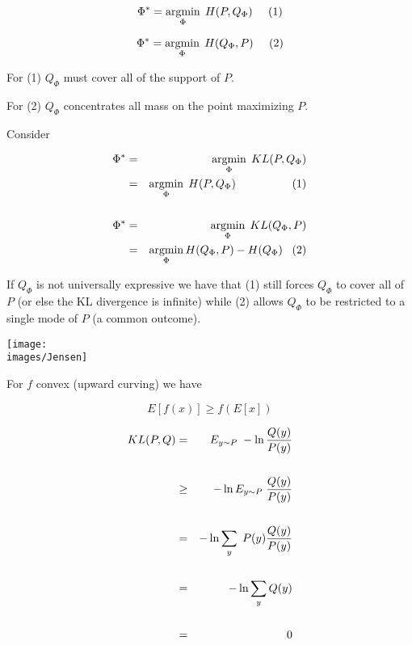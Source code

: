 {$$\Phi^* = \operatorname*{argmin}_\Phi \;H(P,Q_\Phi)\;\;\;\;\;(1)$$

\vfill
$$\Phi^* = \operatorname*{argmin}_\Phi \;H(Q_\Phi,P)\;\;\;\;\;(2)$$

\vfill
For (1) $Q_\Phi$ must cover all of the support of $P$.

\vfill
For (2) $Q_\Phi$ concentrates all mass on the point maximizing $P$.

    
Consider 


\begin{eqnarray*}
  \Phi^* & = & \operatorname*{argmin}_\Phi \;KL(P,Q_\Phi) \\
  & = & \operatorname*{argmin}_\Phi\; H(P,Q_\Phi)\;\;\;\;\;\;\;\;\;\;\;\;\;\;\;\;\;\;(1) \\
  \\
  \Phi^* & = & \operatorname*{argmin}_\Phi \;KL(Q_\Phi,P) \\
  & = & \operatorname*{argmin}_\Phi H(Q_\Phi,P) - H(Q_\Phi)\;\;\;(2)
  \end{eqnarray*}

\vfill
If $Q_\Phi$ is not universally expressive we have that (1) still forces $Q_\Phi$ to cover all of $P$ (or else the KL divergence is infinite)
while (2) allows $Q_\Phi$ to be restricted to a single mode of $P$ (a common outcome).


\centerline{\texttt{[image: \\images/Jensen]}}

\vfill
For $f$ convex (upward curving) we have

\vfill
$$E[f(x)] \geq f(E[x])$$


\begin{eqnarray*}
  KL(P,Q) & = & E_{y \sim P}\;- \ln \frac{Q(y)}{P(y)} \\
  \\
  & \geq & - \ln E_{y\sim P}\;\frac{Q(y)}{P(y)} \\
  \\
  & = & - \ln \sum_y\; P(y) \frac{Q(y)}{P(y)}  \\
  \\
  & = & - \ln \sum_y Q(y) \\
  \\
  & = & 0
\end{eqnarray*}

}
